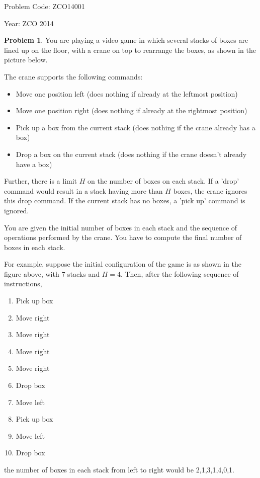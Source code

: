 \documentclass[twoside,12pt,a4paper,english]{book}
\theoremstyle{definition}
\theoremstyle{problemstyle}
\newtheorem*{problem}{Problem} %
\theoremstyle{problemstyle}
\theoremstyle{problemstyle}
\begin{document}
Problem Code: ZCO14001

Year: ZCO 2014

\begin{problem}
You are playing a video game in which several stacks of boxes are lined up on the floor, with a crane on top to rearrange the boxes, as shown in the picture below.



The crane supports the following commands:

\begin{itemize}
    \item Move one position left (does nothing if already at the leftmost position)
    \item Move one position right (does nothing if already at the rightmost position)
    \item Pick up a box from the current stack (does nothing if the crane already has a box)
    \item Drop a box on the current stack (does nothing if the crane doesn't already have a box)
\end{itemize}

Further, there is a limit $H$ on the number of boxes on each stack. If a 'drop' command would result in a stack having more than $H$ boxes, the crane ignores this drop command. If the current stack has no boxes, a 'pick up' command is ignored.


You are given the initial number of boxes in each stack and the sequence of operations performed by the crane. You have to compute the final number of boxes in each stack.


For example, suppose the initial configuration of the game is as shown in the figure above, with $7$ stacks and $H=4$. Then, after the following sequence of instructions,

\begin{enumerate}
    \item Pick up box
    \item Move right
    \item Move right
    \item Move right
    \item Move right
    \item Drop box
    \item Move left
    \item Pick up box
    \item Move left
    \item Drop box
\end{enumerate}

the number of boxes in each stack from left to right would be 2,1,3,1,4,0,1.
\end{problem}
\end{document}
